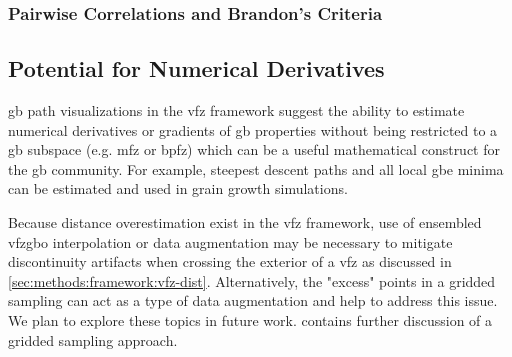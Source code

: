 \documentclass[final,twocolumn,12pt]{elsarticle}
\begin{document}
    \subsubsection{Pairwise Correlations and Brandon's Criteria} \label{sec:discuss:correlation:pairwise}
    
	 \subsection{Potential for Numerical Derivatives}
	\label{sec:discuss:deriv}
	
	 \Gls{gb} path visualizations in the \gls{vfz} framework suggest the ability to estimate numerical derivatives or gradients of \gls{gb} properties without being restricted to a \gls{gb} subspace (e.g. \gls{mfz} or \gls{bpfz}) which can be a useful mathematical construct for the \gls{gb} community. For example, steepest descent paths and all local \gls{gbe} minima can be estimated and used in grain growth simulations.
	
	Because distance overestimation exist in the \gls{vfz} framework, use of ensembled \gls{vfzgbo} interpolation or data augmentation may be necessary to mitigate discontinuity artifacts when crossing the exterior of a \gls{vfz} as discussed in \cref{sec:methods:framework:vfz-dist}. Alternatively, the "excess" points in a gridded sampling can act as a type of data augmentation and help to address this issue. We plan to explore these topics in future work.  contains further discussion of a gridded sampling approach.
	
\end{document}
